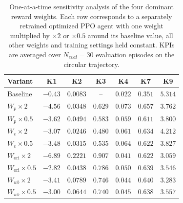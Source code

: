 \documentclass{ieeeaccess}
\begin{document}
\begin{table}[!t]
    \centering
    \caption{One-at-a-time sensitivity analysis of the four dominant reward weights. Each row corresponds to
    a separately retrained optimized PPO agent with one weight multiplied by $\times 2$ or
    $\times 0.5$ around its baseline value,
    all other weights and training settings held constant. KPIs are averaged over $N_{eval}=30$ evaluation
    episodes on the circular
    trajectory.}
    \label{tab:reward_sensitivity}
    \renewcommand{\arraystretch}{1.2}
    \setlength{\tabcolsep}{3pt}
    \begin{tabular}{lcccccc}
        \toprule
        \textbf{Variant} & \textbf{K1} & \textbf{K2} & \textbf{K3} & \textbf{K4} & \textbf{K7} & \textbf{K9} \\
        \midrule
        Baseline                            & $\mathbf{-0.43}$ & $\mathbf{0.0083}$ & --                & $\mathbf{0.022}$ & $\mathbf{0.351}$ & $5.314$ \\
        $W_p \times 2$                      & $-4.56$          & $0.0348$          & $0.629$           & $0.073$          & $0.657$          & $3.762$ \\
        $W_p \times 0.5$                    & $-3.62$          & $0.0494$          & $0.583$           & $0.059$          & $0.611$          & $3.800$ \\
        $W_v \times 2$                      & $-3.07$          & $0.0246$          & $\mathbf{0.480}$  & $0.061$          & $0.634$          & $4.212$ \\
        $W_v \times 0.5$                    & $-3.48$          & $0.0315$          & $0.535$           & $0.064$          & $0.622$          & $3.827$ \\
        $W_{\mathrm{ori}} \times 2$         & $-6.89$          & $0.2221$          & $0.907$           & $0.041$          & $0.622$          & $3.059$ \\
        $W_{\mathrm{ori}} \times 0.5$       & $-2.82$          & $0.0438$          & $0.786$           & $0.050$          & $0.639$          & $3.546$ \\
        $W_{wb} \times 2$                   & $-3.41$          & $0.0789$          & $0.746$           & $0.044$          & $0.640$          & $3.283$ \\
        $W_{wb} \times 0.5$                 & $-3.00$          & $0.0644$          & $0.740$           & $0.045$          & $0.638$          & $3.557$ \\
        \bottomrule
    \end{tabular}
\end{table}
\end{document}
